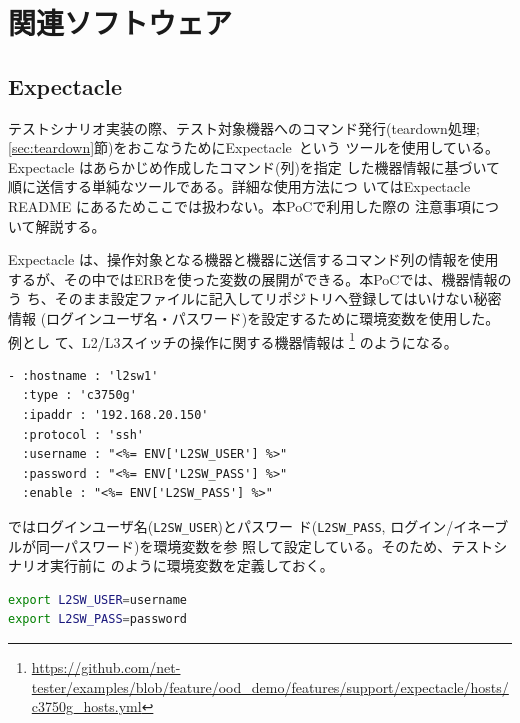 
\chapter{関連ソフトウェア}

 \section{Expectacle}
 \label{sec:expectacle}

テストシナリオ実装の際、テスト対象機器へのコマンド発行(teardown処理;
\ref{sec:teardown}節)をおこなうためにExpectacle~\cite{expectacle}という
ツールを使用している。Expectacle はあらかじめ作成したコマンド(列)を指定
した機器情報に基づいて順に送信する単純なツールである。詳細な使用方法につ
いてはExpectacle README にあるためここでは扱わない。本PoCで利用した際の
注意事項について解説する。

Expectacle は、操作対象となる機器と機器に送信するコマンド列の情報を使用
するが、その中ではERBを使った変数の展開ができる。本PoCでは、機器情報のう
ち、そのまま設定ファイルに記入してリポジトリへ登録してはいけない秘密情報
(ログインユーザ名・パスワード)を設定するために環境変数を使用した。例とし
て、L2/L3スイッチの操作に関する機器情報は
\footnote{\url{https://github.com/net-tester/examples/blob/feature/ood_demo/features/support/expectacle/hosts/c3750g_hosts.yml}}
のようになる。
\begin{lstlisting}[caption=L2スイッチ(L2SW1)ログイン情報,label=lst:l2sw1-login]
- :hostname : 'l2sw1'
  :type : 'c3750g'
  :ipaddr : '192.168.20.150'
  :protocol : 'ssh'
  :username : "<%= ENV['L2SW_USER'] %>"
  :password : "<%= ENV['L2SW_PASS'] %>"
  :enable : "<%= ENV['L2SW_PASS'] %>"
\end{lstlisting}
ではログインユーザ名(\verb|L2SW_USER|)とパスワー
ド(\verb|L2SW_PASS|, ログイン/イネーブルが同一パスワード)を環境変数を参
照して設定している。そのため、テストシナリオ実行前に
のように環境変数を定義しておく。
\begin{lstlisting}[language=sh,caption=ログイン情報環境変数の設定,label=lst:l2sw1-login-envvar]
export L2SW_USER=username
export L2SW_PASS=password
\end{lstlisting}

